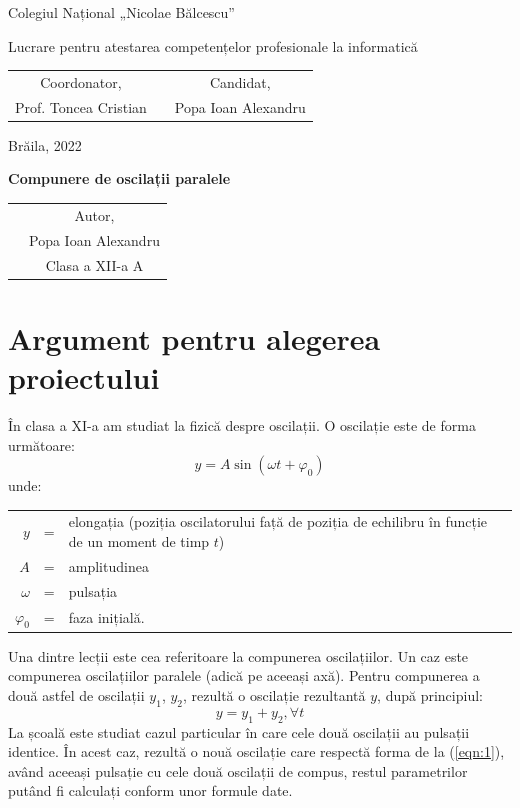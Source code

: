 \documentclass[numbers=endperiod]{scrreprt}
\begin{document}
\begin{titlepage}
  \begin{flushleft}
  Colegiul Național „Nicolae Bălcescu”
  \end{flushleft}
  \vfill

  \centering
  \Huge
  Lucrare pentru atestarea competențelor profesionale la informatică
  \vfill

  \normalsize
  \begin{tabularx}{\textwidth}{cXc}
    Coordonator, & & Candidat, \\
    Prof. Toncea Cristian & & Popa Ioan Alexandru
  \end{tabularx}
  \vspace{3cm}

  Brăila, 2022
\end{titlepage}
\begin{titlepage}
  \centering
  \null
  \vfill

  \Huge
  \bfseries
  \sffamily
  Compunere de oscilații paralele
  \vfill

  \normalsize
  \mdseries
  \rmfamily
  \begin{tabularx}{\textwidth}{Xc}
    & Autor, \\
    & Popa Ioan Alexandru \\
    & Clasa a XII-a A
  \end{tabularx}
  \vspace{3cm}
\end{titlepage}
\tableofcontents
\chapter{Argument pentru alegerea proiectului}
În clasa a XI-a am studiat la fizică despre oscilații. O oscilație este de forma următoare:
\begin{equation}
\label{eqn:1}
y = A\sin(\omega t + \varphi_0)
\end{equation}
unde:\\
\setlength{\tabcolsep}{3pt}
\begin{tabularx}{\linewidth}{rcX}
$y$ &=& elongația (poziția oscilatorului față de poziția de echilibru în funcție de un moment de timp $t$)\\
$A$ &=& amplitudinea\\
$\omega$ &=& pulsația\\
$\varphi_0$ &=& faza inițială.
\end{tabularx}
Una dintre lecții este cea referitoare la compunerea oscilațiilor. Un caz este compunerea oscilațiilor paralele (adică pe aceeași axă). Pentru compunerea a două astfel de oscilații $y_1$, $y_2$, rezultă o oscilație rezultantă $y$, după principiul:
\begin{equation}
\label{eqn:2}
y = y_1 + y_2 ,\forall t 
\end{equation}
La școală este studiat cazul particular în care cele două oscilații au pulsații identice. În acest caz, rezultă o nouă oscilație care respectă forma de la (\ref{eqn:1}), având aceeași pulsație cu cele două oscilații de compus, restul parametrilor putând fi calculați conform unor formule date.
\end{document}
